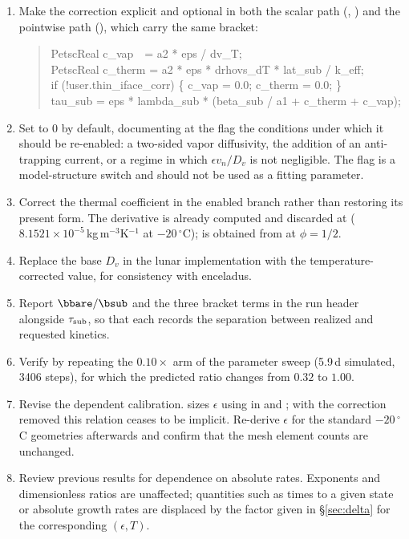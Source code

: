 \begin{enumerate}\setlength\itemsep{0.2em}
\item Make the correction explicit and optional in both the scalar path
      (, ) and the pointwise path
      (), which carry the same bracket:
\begin{quote}\small\ttfamily
PetscReal c\_vap~~= a2 * eps / dv\_T;\\
PetscReal c\_therm = a2 * eps * drhovs\_dT * lat\_sub / k\_eff;\\
if (!user.thin\_iface\_corr) \{ c\_vap = 0.0; c\_therm = 0.0; \}\\
tau\_sub = eps * lambda\_sub * (beta\_sub / a1 + c\_therm + c\_vap);
\end{quote}
\item Set  to $0$ by default, documenting at the flag the
      conditions under which it should be re-enabled: a two-sided vapor diffusivity, the
      addition of an anti-trapping current, or a regime in which $\epsilon v_n/D_v$ is not
      negligible. The flag is a model-structure switch and should not be used as a fitting
      parameter.
\item Correct the thermal coefficient in the enabled branch rather than restoring its
      present form. The derivative  is already computed and discarded at
       ($8.1521\times10^{-5}$\,kg\,m$^{-3}$K$^{-1}$ at
      $-20\,^\circ$C);  is obtained from  at $\phi=1/2$.
\item Replace the base $D_v$ in the lunar implementation with the temperature-corrected
      value, for consistency with enceladus.
\item Report $\bbare/\bsub$ and the three bracket terms in the run header alongside
      $\tau_{\rm sub}$, so that each  records the separation between
      realized and requested kinetics.
\item Verify by repeating the $0.10\times$ arm of the parameter sweep (5.9\,d simulated,
      3406 steps), for which the predicted ratio changes from $0.32$ to $1.00$.
\item Revise the dependent calibration.  sizes $\epsilon$ using
       in  and ; with the
      correction removed this relation ceases to be implicit. Re-derive $\epsilon$ for the
      standard $-20\,^\circ$C geometries afterwards and confirm that the mesh element
      counts are unchanged.
\item Review previous results for dependence on absolute rates. Exponents and
      dimensionless ratios are unaffected; quantities such as times to a given state or
      absolute growth rates are displaced by the factor given in \S\ref{sec:delta} for the
      corresponding $(\epsilon,T)$.
\end{enumerate}


